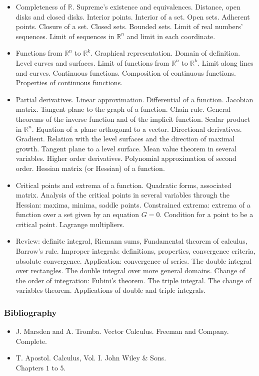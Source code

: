 \documentclass[spanish]{article}
\newcommand{\RR}{\mathbb{R}}
\begin{document}
\begin{itemize}
  \item
Completeness of $\RR$. Supreme's existence and equivalences. Distance, open disks and closed disks. Interior points. Interior of a set. Open sets. Adherent points. Closure of a set. Closed sets. Bounded sets. Limit of real numbers' sequences. Limit of sequences in $\RR^n$ and limit in each coordinate.

  \item
Functions from $\RR^n$ to $\RR^k$. Graphical representation. Domain of definition. Level curves and surfaces. Limit of functions from $\RR^n$ to $\RR^k$. Limit along lines and curves. Continuous functions. Composition of continuous functions. Properties of continuous functions.

  \item
Partial derivatives. Linear approximation. Differential of a function. Jacobian matrix. Tangent plane to the graph of a function. Chain rule. General theorems of the inverse function and of the implicit function. Scalar product in $\RR^n$. Equation of a plane orthogonal to a vector. Directional derivatives. Gradient. Relation with the level surfaces and the direction of maximal growth. Tangent plane to a level surface. Mean value theorem in several variables. Higher order derivatives. Polynomial approximation of second order. Hessian matrix (or Hessian) of a function.

  \item
Critical points and extrema of a function. Quadratic forms, associated matrix. Analysis of the critical points in several variables through the Hessian: maxima, minima, saddle points. Constrained extrema: extrema of a function over a set given by an equation $G = 0$. Condition for a point to be a critical point. Lagrange multipliers.

  \item
Review: definite integral, Riemann sums, Fundamental theorem of calculus, Barrow's rule. Improper integrals: definitions, properties, convergence criteria, absolute convergence. Application: convergence of series. The double integral over rectangles. The double integral over more general domains. Change of the order of integration: Fubini's theorem. The triple integral. The change of variables theorem. Applications of double and triple integrals.

\end{itemize}

\subsubsection{Bibliography}
\begin{itemize}
  \item J. Marsden and A. Tromba. Vector Calculus. Freeman and Company.\\
    Complete.

  \item T. Apostol. Calculus, Vol. I. John Wiley \& Sons.\\
    Chapters $1$ to $5$.

\end{itemize}
\end{document}
